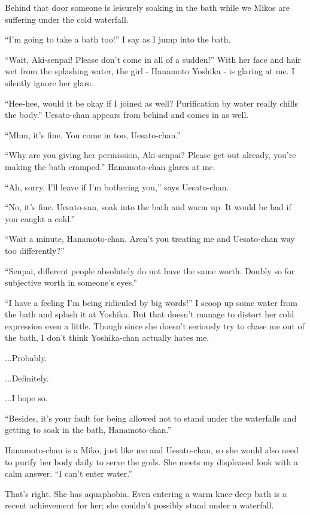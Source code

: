 Behind that door someone is leisurely soaking in the bath while we Mikos are suffering under the cold waterfall.

``I'm going to take a bath too!'' I say as I jump into the bath.

``Wait, Aki-senpai! Please don't come in all of a sudden!''  With her face and hair wet from the splashing water, the girl - Hanamoto Yoshika - is glaring at me. I silently ignore her glare.

``Hee-hee, would it be okay if I joined as well? Purification by water really chills the body.''  Uesato-chan appears from behind and comes in as well.

``Mhm, it's fine. You come in too, Uesato-chan.''

``Why are you giving her permission, Aki-senpai? Please get out already, you're making the bath cramped.'' Hanamoto-chan glares at me.

``Ah, sorry. I'll leave if I'm bothering you,'' says Uesato-chan.

``No, it's fine. Uesato-san, soak into the bath and warm up. It would be bad if you caught a cold.''

``Wait a minute, Hanamoto-chan. Aren't you treating me and Uesato-chan way too differently?''

``Senpai, different people absolutely do not have the same worth. Doubly so for subjective worth in someone's eyes.''

``I have a feeling I'm being ridiculed by big words!''  I scoop up some water from the bath and splash it at Yoshika. But that doesn't manage to distort her cold expression even a little. Though since she doesn't seriously try to chase me out of the bath, I don't think Yoshika-chan actually hates me.

...Probably.

...Definitely.

...I hope so.

``Besides, it's your fault for being allowed not to stand under the waterfalls and getting to soak in the bath, Hanamoto-chan.''

Hanamoto-chan is a Miko, just like me and Uesato-chan, so she would also need to purify her body daily to serve the gods. She meets my displeased look with a calm answer.  ``I can't enter water.''

That's right. She has aquaphobia. Even entering a warm knee-deep bath is a recent achievement for her; she couldn't possibly stand under a waterfall.

